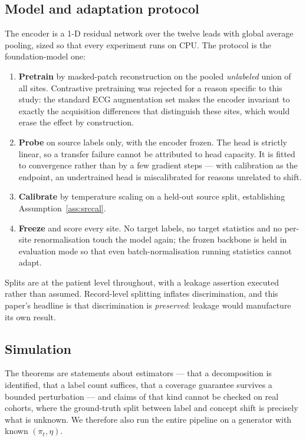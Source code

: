 \subsection{Model and adaptation protocol}

The encoder is a 1-D residual network over the twelve leads with global average
pooling, sized so that every experiment runs on CPU.  The protocol is the
foundation-model one:

\begin{enumerate}[leftmargin=*,itemsep=1pt]
\item \textbf{Pretrain} by masked-patch reconstruction on the pooled
\emph{unlabeled} union of all sites.  Contrastive pretraining was rejected for
a reason specific to this study: the standard ECG augmentation set makes the
encoder invariant to exactly the acquisition differences that distinguish these
sites, which would erase the effect by construction.
\item \textbf{Probe} on source labels only, with the encoder frozen.  The head
is strictly linear, so a transfer failure cannot be attributed to head
capacity.  It is fitted to convergence rather than by a few gradient steps ---
with calibration as the endpoint, an undertrained head is miscalibrated for
reasons unrelated to shift.
\item \textbf{Calibrate} by temperature scaling on a held-out source split,
establishing Assumption~\ref{ass:srccal}.
\item \textbf{Freeze} and score every site.  No target labels, no target
statistics and no per-site renormalisation touch the model again; the frozen
backbone is held in evaluation mode so that even batch-normalisation running
statistics cannot adapt.
\end{enumerate}

Splits are at the patient level throughout, with a leakage assertion executed
rather than assumed.  Record-level splitting inflates discrimination, and this
paper's headline is that discrimination is \emph{preserved}: leakage would
manufacture its own result.

\subsection{Simulation}

The theorems are statements about estimators --- that a decomposition is
identified, that a label count suffices, that a coverage guarantee survives a
bounded perturbation --- and claims of that kind cannot be checked on real
cohorts, where the ground-truth split between label and concept shift is
precisely what is unknown.  We therefore also run the entire pipeline on a
generator with known $(\pi_t,\eta)$.

